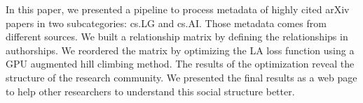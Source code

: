 In this paper, we presented a pipeline to process metadata of highly cited arXiv papers in two subcategories: cs.LG and cs.AI.
Those metadata comes from different sources.
We built a relationship matrix by defining the relationships in authorships.
We reordered the matrix by optimizing the LA loss function using a GPU augmented hill climbing method.
The results of the optimization reveal the structure of the research community.
We presented the final results as a web page to help other researchers to understand this social structure better.
